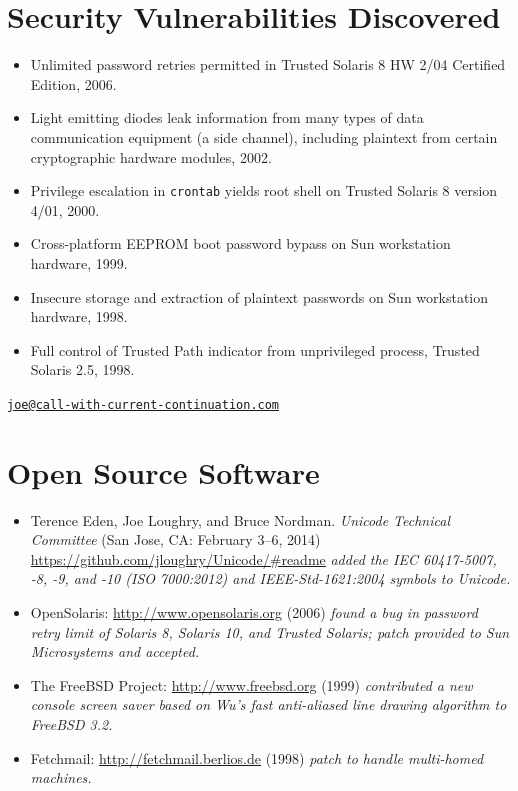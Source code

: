 \documentclass[12pt,twoside,letterpaper]{article}
\begin{document}
\section*{Security Vulnerabilities Discovered}
\vspace{-2mm}
\begin{itemize}
	\item Unlimited password retries permitted in Trusted Solaris 8 HW 2/04
		Certified Edition, 2006.\vspace{-2mm}
	\item Light emitting diodes leak information from many types of data
		communication equipment (a side channel), including plaintext from
		certain cryptographic hardware modules, 2002.\vspace{-1.5mm}
	\item Privilege escalation in \verb,crontab, yields root shell on Trusted
		Solaris 8 version 4/01, 2000.\vspace{-2mm}
	\item Cross-platform EEPROM boot password bypass on Sun workstation
		hardware, 1999.\vspace{-2mm}
	\item Insecure storage and extraction of plaintext passwords on Sun workstation
		hardware, 1998.\vspace{-2mm}
	\item Full control of Trusted Path indicator from unprivileged process,
		Trusted Solaris 2.5, 1998.\vspace{-2mm}
\end{itemize}

\newpage


\vspace*{-11mm}\hfill\href{mailto:joe@call-with-current-continuation.com}%
{\nolinkurl{joe@call-with-current-continuation.com}}

\vspace{-5mm}
\section*{Open Source Software}
\vspace{-2mm}
\begin{itemize}
	\item Terence Eden, Joe Loughry, and Bruce Nordman. \emph{Unicode
		Technical Committee} (San Jose, CA: February 3--6, 2014)
		\url{https://github.com/jloughry/Unicode/#readme} \emph{added
		the IEC 60417-5007, -8, -9, and -10 (ISO 7000:2012) and
		IEEE-Std-1621:2004 symbols to Unicode.}
	\item OpenSolaris: \url{http://www.opensolaris.org} (2006)
		\emph{found a bug in password retry limit of Solaris 8, Solaris 10,
		and Trusted Solaris; patch provided to Sun Microsystems and accepted.}
	\item The FreeBSD Project: \url{http://www.freebsd.org} (1999)
		\emph{contributed a new console screen saver based on Wu's fast
		anti-aliased line drawing algorithm to FreeBSD 3.2.}
	\item Fetchmail: \url{http://fetchmail.berlios.de} (1998)
		\emph{patch to handle multi-homed machines.}
\end{itemize}
\end{document}

